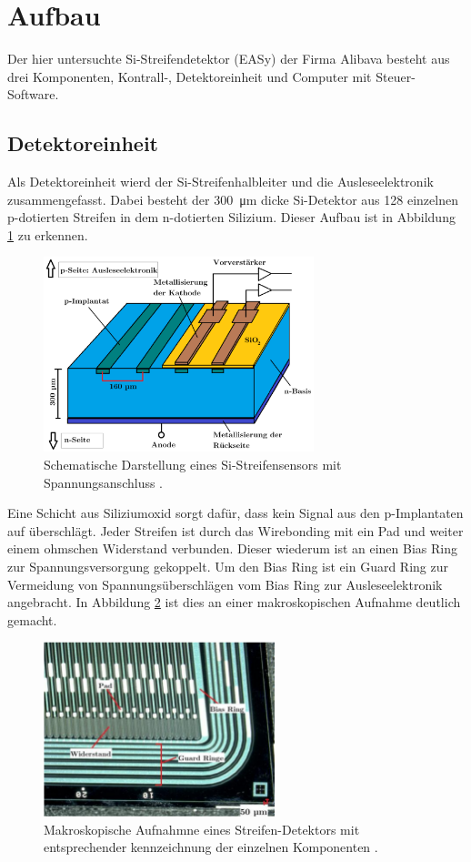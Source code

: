 \newpage
\section{Aufbau}
\label{sec:Aufbau}
Der hier untersuchte Si-Streifendetektor (EASy) der Firma Alibava besteht aus drei Komponenten, Kontrall-, Detektoreinheit und Computer mit Steuer-Software.

\subsection{Detektoreinheit}
\label{sec:Detektoreinheit}
 Als Detektoreinheit wierd der Si-Streifenhalbleiter und die Ausleseelektronik
 zusammengefasst. Dabei besteht der \SI{300}{\micro\meter} dicke Si-Detektor
 aus 128 einzelnen p-dotierten Streifen in dem n-dotierten Silizium.  Dieser
 Aufbau ist in Abbildung \ref{fig:schema} zu erkennen.
 \begin{figure}[htb]
   \centering
   \includegraphics[width=0.7\textwidth]{images/Schema.png}
   \caption{Schematische Darstellung eines Si-Streifensensors mit Spannungsanschluss \cite{anleitung}.}
   \label{fig:schema}
 \end{figure}
Eine Schicht aus Siliziumoxid sorgt dafür, dass kein Signal aus den p-Implantaten
auf überschlägt. Jeder Streifen ist durch das Wirebonding mit ein Pad und weiter
einem ohmschen Widerstand
verbunden. Dieser wiederum ist an einen Bias Ring zur Spannungsversorgung gekoppelt.
Um den Bias Ring ist ein Guard Ring zur Vermeidung von Spannungsüberschlägen vom Bias
Ring zur Ausleseelektronik angebracht. In Abbildung \ref{fig:streifen} ist dies an
einer makroskopischen Aufnahme deutlich gemacht.
\begin{figure}[htb]
  \centering
  \includegraphics[width=0.6\textwidth]{images/Sensor.png}
  \caption{Makroskopische Aufnahmne eines Streifen-Detektors mit entsprechender kennzeichnung der einzelnen Komponenten \cite{anleitung}.}
  \label{fig:streifen}
\end{figure}
